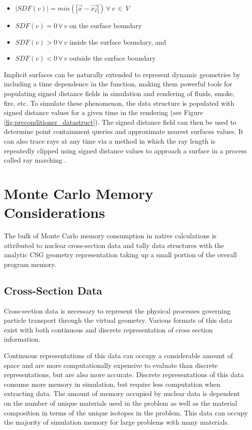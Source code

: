 \begin{itemize}
\item $ |SDF(v)| = min(|\vec{x}-\vec{x_I}|) \, \forall \, v \, \in \, V$
\item $ SDF(v) = 0 \, \forall \, v$ on the surface boundary
\item $ SDF(v) > 0 \, \forall \, v$ inside the surface boundary, and
\item $ SDF(v) < 0 \, \forall \, v$ outside the surface boundary
\end{itemize}

Implicit surfaces can be naturally extended to represent dynamic geometries by
including a time dependence in the function, making them powerful tools for
populating signed distance fields in simulation and rendering of fluids, smoke,
fire, etc. To simulate these phenomenon, the data structure is populated with
signed distance values for a given time in the rendering (see Figure
\ref{fig:preconditioner_datastruct}). The signed distance field can then be used
to determine point containment queries and approximate nearest surfaces
values. It can also trace rays at any time via a method in which the ray length
is repeatedly clipped using signed distance values to approach a surface in a
process called ray marching \cite{Tomczak_2012}.

\section{Monte Carlo Memory Considerations}\label{sec:mc_mem}

The bulk of Monte Carlo memory consumption in native calculations is attributed
to nuclear cross-section data and tally data structures with the analytic CSG
geometry representation taking up a small portion of the overall program memory.

\subsection{Cross-Section Data}

Cross-section data is necessary to represent the physical
processes governing particle transport through the virtual geometry. Various
formats of this data exist with both continuous and discrete representation of
cross section information.

Continuous representations of this data can occupy a considerable amount of
space and are more computationally expensive to evaluate than discrete
representations, but are also more accurate. Discrete representations of this
data consume more memory in simulation, but require less computation when
extracting data. The amount of memory occupied by nuclear data is dependent on
the number of unique materials used in the problem as well as the material
composition in terms of the unique isotopes in the problem. This data can occupy
the majority of simulation memory for large problems with many materials.

